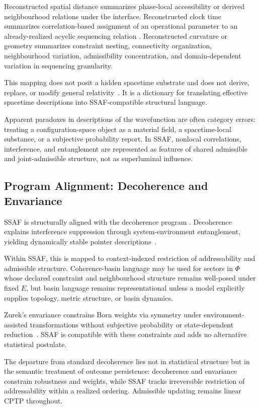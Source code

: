 \documentclass[aps,prx,onecolumn,11pt]{revtex4-2}
\theoremstyle{plain}
\theoremstyle{definition}
\theoremstyle{remark}
\begin{document}
Reconstructed spatial distance summarizes phase-local accessibility or
derived neighbourhood relations under the interface. Reconstructed
clock time summarizes correlation-based assignment of an operational
parameter to an already-realized acyclic sequencing relation
\cite{PageWootters1983,Rovelli1991}. Reconstructed curvature or
geometry summarizes constraint nesting, connectivity organization,
neighbourhood variation, admissibility concentration, and
domain-dependent variation in sequencing granularity.

This mapping does not posit a hidden spacetime substrate and does not
derive, replace, or modify general relativity~\cite{Einstein1915,Wald1984}.
It is a dictionary for translating effective spacetime descriptions into
SSAF-compatible structural language.

Apparent paradoxes in descriptions of the wavefunction are often
category errors: treating a configuration-space object as a material field, a
spacetime-local substance, or a subjective probability report. In SSAF,
nonlocal correlations, interference, and entanglement are represented as
features of shared admissible and joint-admissible structure, not as
superluminal influence.

\subsection{Program Alignment: Decoherence and Envariance}
\label{appB:zurek}

SSAF is structurally aligned with the decoherence program
\cite{Zurek2003}. Decoherence explains interference suppression through
system-environment entanglement, yielding dynamically stable pointer
descriptions~\cite{Zurek2003,Schlosshauer2007}.

Within SSAF, this is mapped to context-indexed restriction of
addressability and admissible structure. Coherence-basin language may
be used for sectors in \(\Phi\) whose declared constraint and
neighbourhood structure remains well-posed under fixed \(E\), but basin
language remains representational unless a model explicitly supplies
topology, metric structure, or basin dynamics.

Zurek's envariance constrains Born weights via symmetry under
environment-assisted transformations without subjective probability or
state-dependent reduction~\cite{Zurek2005,Zurek2009}. SSAF is
compatible with these constraints and adds no alternative statistical
postulate.

The departure from standard decoherence lies not in statistical
structure but in the semantic treatment of outcome persistence:
decoherence and envariance constrain robustness and weights, while SSAF
tracks irreversible restriction of addressability within a realized
ordering. Admissible updating remains linear CPTP throughout.
\end{document}
